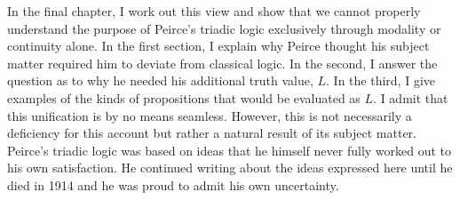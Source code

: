 In the final chapter, I work out this view and show that we cannot properly understand the purpose of Peirce's triadic logic exclusively through modality or continuity alone. In the first section, I explain why Peirce thought his subject matter required him to deviate from classical logic. In the second, I answer the question as to why he needed his additional truth value, $L$. In the third, I give examples of the kinds of propositions that would be evaluated as $L$. I admit that this unification is by no means seamless. However, this is not necessarily a deficiency for this account but rather a natural result of its subject matter. Peirce's triadic logic was based on ideas that he himself never fully worked out to his own satisfaction. He continued writing about the ideas expressed here until he died in 1914 and he was proud to admit his own uncertainty.